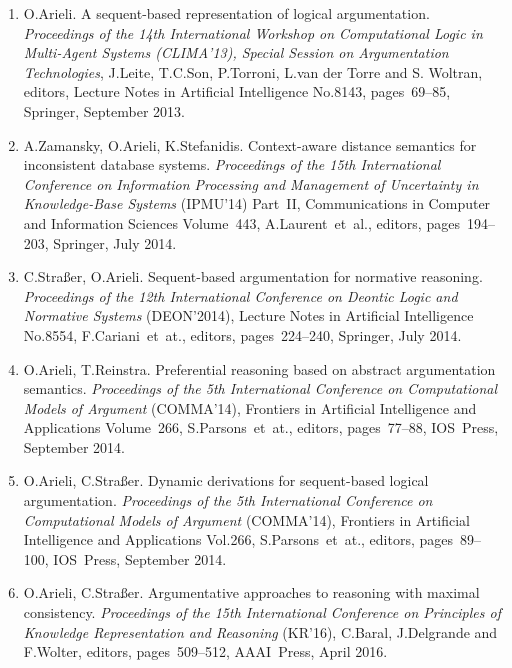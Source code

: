 \documentclass{article}
\begin{document}
\begin{enumerate}
   \item O.Arieli.
         A sequent-based representation of logical argumentation.
         {\em Proceedings of the 14th International Workshop on Computational Logic in Multi-Agent Systems (CLIMA'13),
         Special Session on Argumentation Technologies\/}, J.Leite, T.C.Son, P.Torroni, L.van der Torre
         and S. Woltran, editors, Lecture Notes in Artificial Intelligence No.8143, pages~69--85,
         Springer, September 2013.

   \item A.Zamansky, O.Arieli, K.Stefanidis.
         Context-aware distance semantics for inconsistent database systems.
         {\em Proceedings of the 15th International Conference on Information Processing and Management of Uncertainty
         in Knowledge-Base Systems\/} (IPMU'14) Part~II, Communications in Computer and Information Sciences
         Volume~443, A.Laurent~et~al., editors, pages~194--203, Springer, July 2014.

   \item C.Stra{\ss}er, O.Arieli.
         Sequent-based argumentation for normative reasoning.
         {\em Proceedings of the 12th International Conference on Deontic Logic and Normative Systems\/} (DEON'2014),
         Lecture Notes in Artificial Intelligence No.8554, F.Cariani~et~at., editors, pages~224--240,
         Springer, July 2014.

   \item O.Arieli, T.Reinstra.
         Preferential reasoning based on abstract argumentation semantics.
         {\em Proceedings of the 5th International Conference on Computational Models of Argument\/} (COMMA'14),
         Frontiers in Artificial Intelligence and Applications Volume~266, S.Parsons~et~at., editors,
         pages~77--88, IOS~Press, September 2014.

   \item O.Arieli, C.Stra{\ss}er.
         Dynamic derivations for sequent-based logical argumentation.
         {\em Proceedings of the 5th International Conference on Computational Models of Argument\/} (COMMA'14),
         Frontiers in Artificial Intelligence and Applications Vol.266, S.Parsons~et~at., editors,
         pages~89--100, IOS~Press, September 2014.

   \item O.Arieli, C.Stra{\ss}er.
         Argumentative approaches to reasoning with maximal consistency.
         {\em Proceedings of the 15th International Conference on Principles of Knowledge Representation
         and Reasoning\/} (KR'16), C.Baral, J.Delgrande and F.Wolter, editors, pages~509--512,
         AAAI~Press, April 2016.


\end{enumerate}
\end{document}
